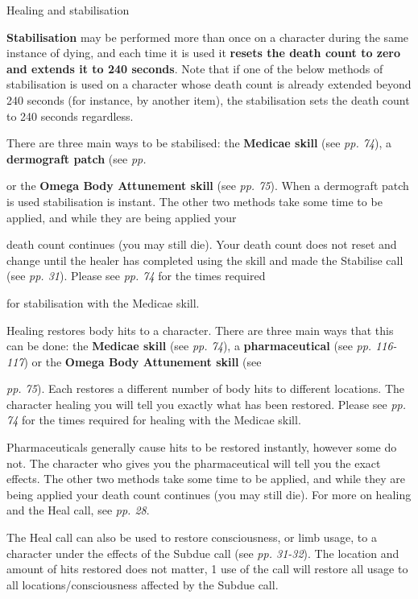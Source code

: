 \documentclass{scrbook}
\begin{document}
Healing and stabilisation

\textbf{Stabilisation} may be performed more than once on a character during the same instance of dying, and each time it is used it \textbf{resets the death count to zero and extends it to 240 seconds}. Note that if one of the below methods of stabilisation is used on a character whose death count is already extended beyond 240 seconds (for instance, by another item), the stabilisation sets the death count to 240 seconds regardless.

There are three main ways to be stabilised: the \textbf{Medicae skill} (see \textit{pp. 74}), a \textbf{dermograft patch} (see \textit{pp.}

or the \textbf{Omega Body Attunement skill} (see \textit{pp. 75}). When a dermograft patch is used stabilisation is instant. The other two methods take some time to be applied, and while they are being applied your

death count continues (you may still die). Your death count does not reset and change until the healer has completed using the skill and made the Stabilise call (see \textit{pp. 31}). Please see \textit{pp. 74} for the times required

for stabilisation with the Medicae skill.

Healing restores body hits to a character. There are three main ways that this can be done: the \textbf{Medicae skill} (see \textit{pp. 74}), a \textbf{pharmaceutical} (see \textit{pp. 116-117}) or the \textbf{Omega Body Attunement skill} (see

\textit{pp. 75}). Each restores a different number of body hits to different locations. The character healing you will tell you exactly what has been restored. Please see \textit{pp. 74} for the times required for healing with the Medicae skill.

Pharmaceuticals generally cause hits to be restored instantly, however some do not. The character who gives you the pharmaceutical will tell you the exact effects. The other two methods take some time to be applied, and while they are being applied your death count continues (you may still die). For more on healing and the Heal call, see \textit{pp. 28}.

The Heal call can also be used to restore consciousness, or limb usage, to a character under the effects of the Subdue call (see \textit{pp. 31-32}). The location and amount of hits restored does not matter, 1 use of the call will restore all usage to all locations/consciousness affected by the Subdue call.
\end{document}
